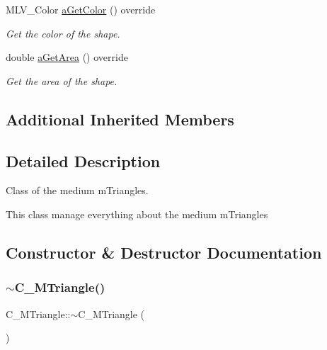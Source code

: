 \begin{DoxyCompactItemize}
M\+L\+V\+\_\+\+Color \hyperlink{classC__MTriangle_aa567d77ce0e6d664beb6eea9268b1bc3}{a\+Get\+Color} () override
\begin{DoxyCompactList}\small\item\em Get the color of the shape. \end{DoxyCompactList}\item 
double \hyperlink{classC__MTriangle_a1baff5085fc1b9822987e3fc307550ce}{a\+Get\+Area} () override
\begin{DoxyCompactList}\small\item\em Get the area of the shape. \end{DoxyCompactList}\end{DoxyCompactItemize}
\subsection*{Additional Inherited Members}


\subsection{Detailed Description}
Class of the medium m\+Triangles. 

This class manage everything about the medium m\+Triangles 

\subsection{Constructor \& Destructor Documentation}
\mbox{\label{classC__MTriangle_afec9368409c7a8bfd03cd0e735e1eee7}} 
\subsubsection{\texorpdfstring{$\sim$\+C\+\_\+\+M\+Triangle()}{~C\_MTriangle()}\hspace{0.1cm}{\footnotesize\ttfamily [1/2]}}
{\footnotesize\ttfamily C\+\_\+\+M\+Triangle\+::$\sim$\+C\+\_\+\+M\+Triangle (\begin{DoxyParamCaption}{ }\end{DoxyParamCaption})\hspace{0.3cm}{\ttfamily [override]}}



